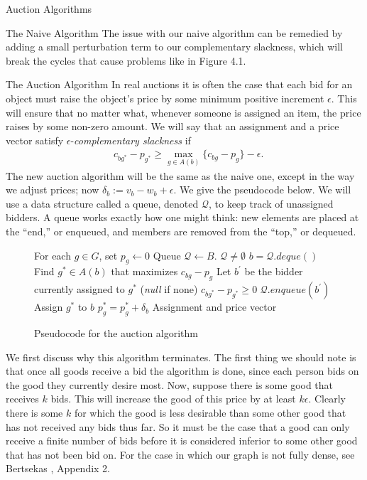 \begin{section}{Auction Algorithms}
\begin{subsection}{The Naive Algorithm}
		The issue with our naive algorithm can be remedied by adding a small perturbation term 
		to our complementary slackness, which will break the cycles that cause problems like in 
		Figure 4.1.
	\end{subsection}
	\begin{subsection}{The Auction Algorithm}
		In real auctions it is often the case that each bid for an object must raise the 
		object's price by some minimum positive increment $\epsilon$. 
		This will ensure that no matter what, whenever someone 
		is assigned an item, the price raises by some non-zero amount. We will say that 
		an assignment and a price vector satisfy $\epsilon$-\emph{complementary 
		slackness} if 
		\begin{align}
			& c_{bg^{*}} - p_{g^{*}} \geq \max_{g\in A(b)} \{c_{bg} - p_g\} - \epsilon.
		\end{align}
		The new auction algorithm will be the same as the naive one, except in the way we 
		adjust prices; now $\delta_b := v_b - w_b + \epsilon$. We give the pseudocode below. We 
		will use a data structure called a queue, denoted $\mathcal{Q}$, to keep track of 
		unassigned bidders. A queue works exactly how one might think: new elements are placed 
		at the ``end,'' or enqueued, and members are removed from the ``top,'' or dequeued.
		\begin{figure}[h]
		\begin{center}
			\begin{minipage}{3in}
			\begin{codebox}
				\li For each $g\in G$, set $p_g \gets 0$
				\li Queue $\mathcal{Q} \gets B$.
				\li \While $\mathcal{Q}\neq \emptyset$
					\Do
				\li		$b = \mathcal{Q}.deque()$
				\li		Find $g^{*}\in A(b)$ that maximizes $c_{bg} - p_{g}$
				\li		Let $b^{'}$ be the bidder currently assigned to $g^{*}$ 
				(\emph{null} if none)
				\li		\If $c_{bg^{*}} - p_{g^{*}} \geq 0$
							\Then
				\li				$\mathcal{Q}.enqueue(b^{'})$
				\li				Assign $g^{*}$ to $b$
				\li				$p_g^{*} = p_g^{*} + \delta_b$
							\End
					\End
				\li \Return Assignment and price vector
			\end{codebox}
			\end{minipage}
			\caption{Pseudocode for the auction algorithm}
		\end{center}
		\end{figure}
		We first discuss why this algorithm terminates. 
		The first thing we should note is that once all goods 
		receive a bid the algorithm is done, since each person bids on the good they 
		currently desire most. Now, suppose there is some good that receives $k$ bids. This will 
		increase the good of this price by at least $k\epsilon$. Clearly there is some $k$ for 
		which the good is less desirable than some other good that has not received any bids 
		thus far. So it must be the case that a good can only receive a finite number of 
		bids before it is considered inferior to some other good that has not been bid on. For 
		the case in which our graph is not fully dense, see Bertsekas \cite{Bertsekas1992}, 
		Appendix 2.
	

\end{subsection}
\end{section}
